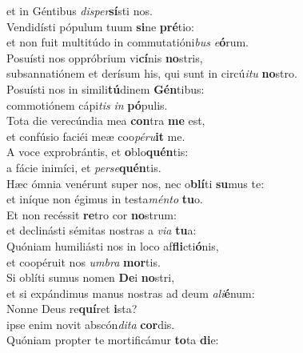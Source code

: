 \oddverse et in Géntibus \textit{di}\textit{sper}\textbf{sí}sti nos.\\
\evenverse Vendidísti pópulum tuum \textbf{si}ne \textbf{pré}tio:~\*\\
\evenverse et non fuit multitúdo in commutatióni\textit{bus} \textit{e}\textbf{ó}rum.\\
\oddverse Posuísti nos oppróbrium vi\textbf{cí}nis \textbf{no}stris,~\*\\
\oddverse subsannatiónem et derísum his, qui sunt in circú\textit{i}\textit{tu} \textbf{no}stro.\\
\evenverse Posuísti nos in simili\textbf{tú}dinem \textbf{Gén}tibus:~\*\\
\evenverse commotiónem cápi\textit{tis} \textit{in} \textbf{pó}pulis.\\
\oddverse Tota die verecúndia mea \textbf{con}tra \textbf{me} est,~\*\\
\oddverse et confúsio faciéi meæ coo\textit{pé}\textit{ru}\textbf{it} me.\\
\evenverse A voce exprobrántis, et \textbf{o}blo\textbf{quén}tis:~\*\\
\evenverse a fácie inimíci, et \textit{per}\textit{se}\textbf{quén}tis.\\
\oddverse Hæc ómnia venérunt super nos, nec o\textbf{blí}ti \textbf{su}mus te:~\*\\
\oddverse et iníque non égimus in testa\textit{mén}\textit{to} \textbf{tu}o.\\
\evenverse Et non recéssit \textbf{re}tro cor \textbf{no}strum:~\*\\
\evenverse et declinásti sémitas nostras a \textit{vi}\textit{a} \textbf{tu}a:\\
\oddverse Quóniam humiliásti nos in loco af\textbf{fli}cti\textbf{ó}nis,~\*\\
\oddverse et coopéruit nos \textit{um}\textit{bra} \textbf{mor}tis.\\
\evenverse Si oblíti sumus nomen \textbf{De}i \textbf{no}stri,~\*\\
\evenverse et si expándimus manus nostras ad deum \textit{a}\textit{li}\textbf{é}num:\\
\oddverse Nonne Deus re\textbf{quí}ret \textbf{i}sta?~\*\\
\oddverse ipse enim novit abscón\textit{di}\textit{ta} \textbf{cor}dis.\\
\evenverse Quóniam propter te mortificámur \textbf{to}ta \textbf{di}e:~\*\\
